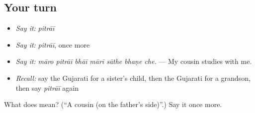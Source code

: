 \subsection*{Your turn}
\begin{itemize}
\raggedright
  \item \emph{Say it:} \emph{pitrāī}
  \item \emph{Say it:} \emph{pitrāī}, once more
  \item \emph{Say it:} \emph{māro pitrāī bhāī mārī sāthe bhaṇe che.} — My cousin studies with me.
  \item \emph{Recall:} say the Gujarati for a sister's child, then the Gujarati for a grandson, then say \emph{pitrāī} again
\end{itemize}

\begin{tcolorbox}[breakable,colback=teal!4,colframe=teal!35!black,title={Before you move on}]
What does  mean? (\textquotedblleft{}A cousin (on the father's side)\textquotedblright{}.) Say it once more.
\end{tcolorbox}
